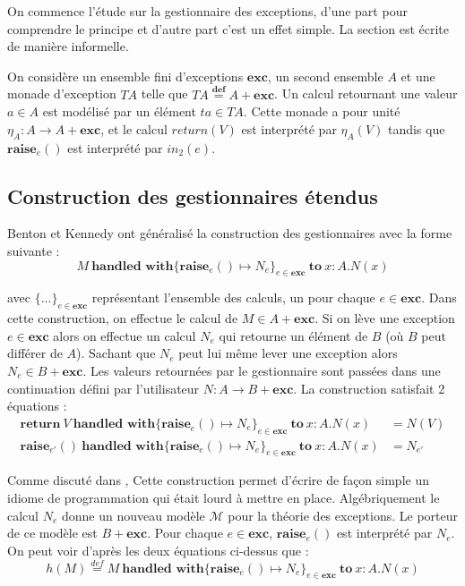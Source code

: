 On commence l'étude sur la gestionnaire des exceptions, d'une part pour comprendre le principe et d'autre part c'est un effet simple. La section est écrite de manière informelle.
\medbreak

On considère un ensemble fini d'exceptions $\textbf{exc}$, un second ensemble $A$ et une monade d'exception $TA$ telle que $TA \overset{\textbf{def}}{=} A + \textbf{exc}$. Un calcul retournant une valeur $a \in A$ est modélisé par un élément $ta \in TA$. Cette monade a pour unité $\eta_A : A \rightarrow A + \textbf{exc}$, et le calcul $return(V)$ est interprété par $\eta_A(V)$ tandis que $\textbf{raise}_e()$ est interprété par $in_2(e)$.

\subsection{Construction des gestionnaires étendus}

	Benton et Kennedy ont généralisé la construction des gestionnaires avec la forme suivante :
	\[M~\textbf{handled~with} \{\textbf{raise}_e() \mapsto N_e\}_{e \in \textbf{exc}}~\textbf{to}~ x:A.N(x)\]
	
	avec $\{...\}_{e \in \textbf{exc}}$ représentant l'ensemble des calculs, un pour chaque $e \in \textbf{exc}$. Dans cette construction, on effectue le calcul de $M \in A + \textbf{exc}$. Si on lève une exception $e \in \textbf{exc}$ alors on effectue un calcul $N_e$ qui retourne un élément de $B$ (où $B$ peut différer de $A$). Sachant que $N_e$ peut lui même lever une exception alors $N_e \in B + \textbf{exc}$. Les valeurs retournées par le gestionnaire sont passées dans une continuation défini par l'utilisateur $N : A \rightarrow B + \textbf{exc}$. La construction satisfait 2 équations :
	\begin{align*}
		\textbf{return} ~V~\textbf{handled~with} \{\textbf{raise}_e() \mapsto N_e\}_{e \in \textbf{exc}}~\textbf{to}~ x:A.N(x) &= N(V)\\
		\textbf{raise}_{e'}()~\textbf{handled~with} \{\textbf{raise}_e() \mapsto N_e\}_{e \in \textbf{exc}}~\textbf{to}~ x:A.N(x) &= N_{e'}
	\end{align*}
	
	Comme discuté dans \cite{DBLP:journals/jfp/BentonK01}, Cette construction permet d'écrire de façon simple un idiome de programmation qui était lourd à mettre en place. 
	\smallbreak
	Algébriquement le calcul $N_e$ donne un nouveau modèle $\mathcal{M}$ pour la théorie des exceptions. Le porteur de ce modèle est $B + \textbf{exc}$. Pour chaque $e \in \textbf{exc}$, $\textbf{raise}_e()$ est interprété par $N_e$. On peut voir d'après les deux équations ci-dessus que :
	\[h(M) \overset{def}{=} M~\textbf{handled~with} \{\textbf{raise}_e() \mapsto N_e\}_{e \in \textbf{exc}}~\textbf{to}~ x:A.N(x)\]
	
